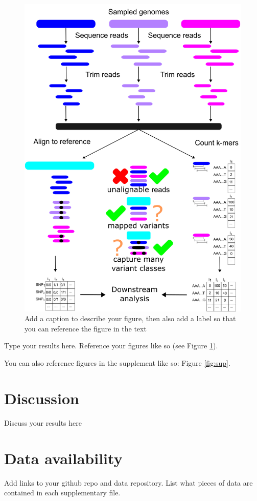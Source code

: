 \documentclass[10pt,letterpaper]{article}
\begin{document}
\begin{figure}[!h]
\centering
\includegraphics[width=0.8\linewidth]{figures/main/a_main_figure.png}
\caption{Add a caption to describe your figure, then also add a label so that you can reference the figure in the text}%
\label{fig:logo}
\end{figure}

Type your results here. Reference your figures like so (see Figure \ref{fig:logo}).

You can also reference figures in the supplement like so: Figure \ref{fig:sup}.

\section*{Discussion}

Discuss your results here

\section*{Data availability}

Add links to your github repo and data repository. List what pieces of data are contained in each supplementary file.
\end{document}
